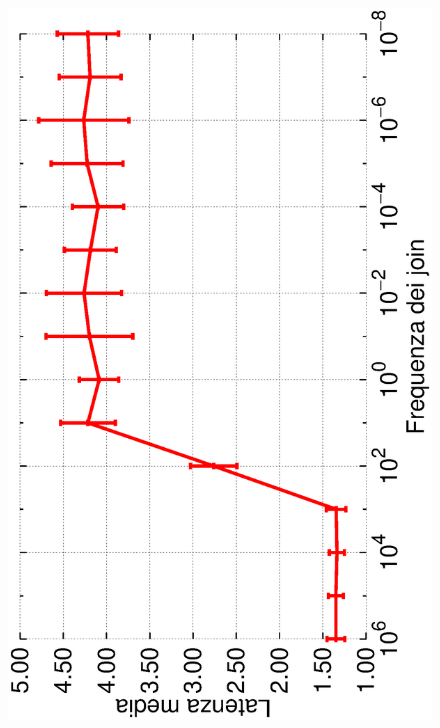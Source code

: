 \documentclass[prodmode,acmtap]{acmlarge}
\begin{document}
\begin{figure}	
\centering
	\includegraphics[scale=.22, angle=-90]{imgs/norelink-freq-hops.eps}
\endminipage\hfill
{}
\centering

\end{figure}
\end{document}
